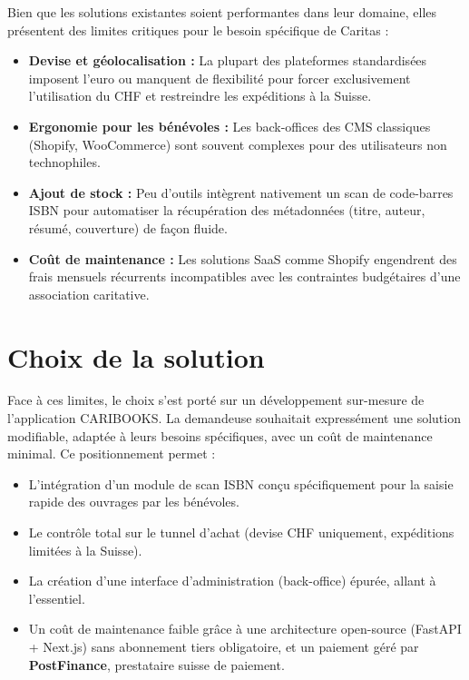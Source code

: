 \documentclass[12pt, a4paper]{report}
\renewcommand{\_}{\origunderscore\allowbreak}
\begin{document}
\noindent Bien que les solutions existantes soient performantes dans leur domaine, elles présentent des limites critiques pour le besoin spécifique de Caritas :

\begin{itemize}
    \item \textbf{Devise et géolocalisation :} La plupart des plateformes standardisées imposent l'euro ou manquent de flexibilité pour forcer exclusivement l'utilisation du CHF et restreindre les expéditions à la Suisse.
    \item \textbf{Ergonomie pour les bénévoles :} Les back-offices des CMS classiques (Shopify, WooCommerce) sont souvent complexes pour des utilisateurs non technophiles.
    \item \textbf{Ajout de stock :} Peu d'outils intègrent nativement un scan de code-barres ISBN pour automatiser la récupération des métadonnées (titre, auteur, résumé, couverture) de façon fluide.
    \item \textbf{Coût de maintenance :} Les solutions SaaS comme Shopify engendrent des frais mensuels récurrents incompatibles avec les contraintes budgétaires d'une association caritative.
\end{itemize}

\section{Choix de la solution}

Face à ces limites, le choix s'est porté sur un développement sur-mesure de l'application CARIBOOKS. La demandeuse souhaitait expressément une solution modifiable, adaptée à leurs besoins spécifiques, avec un coût de maintenance minimal. Ce positionnement permet :

\begin{itemize}
    \item L'intégration d'un module de scan ISBN conçu spécifiquement pour la saisie rapide des ouvrages par les bénévoles.
    \item Le contrôle total sur le tunnel d'achat (devise CHF uniquement, expéditions limitées à la Suisse).
    \item La création d'une interface d'administration (back-office) épurée, allant à l'essentiel.
    \item Un coût de maintenance faible grâce à une architecture open-source (FastAPI + Next.js) sans abonnement tiers obligatoire, et un paiement géré par \textbf{PostFinance}, prestataire suisse de paiement.
\end{itemize}
\end{document}

